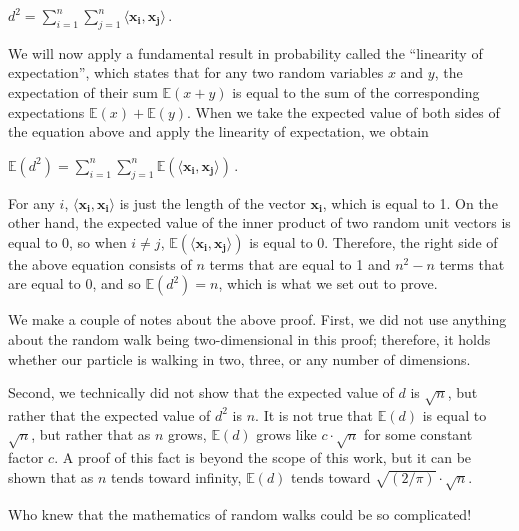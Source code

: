 \begin{center}
$d^2 = \displaystyle\sum_{i=1}^n\sum_{j=1}^n \langle \mathbf{x_i}, \mathbf{x_j} \rangle$\,.
\end{center}

We will now apply a fundamental result in probability called the ``linearity of expectation'', which states that for any two random variables $x$ and $y$, the expectation of their sum $\mathbb{E}(x + y)$ is equal to the sum of the corresponding expectations $\mathbb{E}(x) + \mathbb{E}(y)$. When we take the expected value of both sides of the equation above and apply the linearity of expectation, we obtain

\begin{center}
$\mathbb{E}(d^2) = \displaystyle\sum_{i=1}^n\sum_{j=1}^n \mathbb{E}\left(\langle \mathbf{x_i}, \mathbf{x_j} \rangle\right)$\,.
\end{center}

For any $i$, $\langle \mathbf{x_i}, \mathbf{x_i} \rangle$ is just the length of the vector $\mathbf{x_i}$, which is equal to 1.  On the other hand, the expected value of the inner product of two random unit vectors is equal to 0, so when $i \neq j$, $\mathbb{E}\left(\langle \mathbf{x_i}, \mathbf{x_j} \rangle\right)$ is equal to 0. Therefore, the right side of the above equation consists of $n$ terms that are equal to 1 and $n^2-n$ terms that are equal to 0, and so $\mathbb{E}(d^2) = n$, which is what we set out to prove.

We make a couple of notes about the above proof. First, we did not use anything about the random walk being two-dimensional in this proof; therefore, it holds whether our particle is walking in two, three, or any number of dimensions.

Second, we technically did not show that the expected value of $d$ is $\sqrt{n}$, but rather that the expected value of $d^2$ is $n$. It is not true that $\mathbb{E}(d)$ is equal to $\sqrt{n}$, but rather that as $n$ grows, $\mathbb{E}(d)$ grows like $c \cdot \sqrt{n}$ for some constant factor $c$. A proof of this fact is beyond the scope of this work, but it can be shown that as $n$ tends toward infinity, $\mathbb{E}(d)$ tends toward $\sqrt{(2/\pi)} \cdot \sqrt{n}$.

Who knew that the mathematics of random walks could be so complicated!